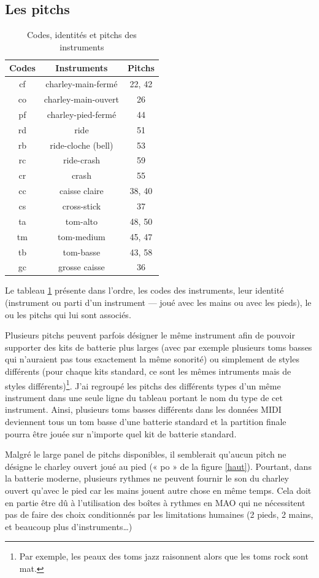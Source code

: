 \subsection*{Les pitchs}
\begin{table}[h]
	\centering
	\begin{tabular}{|c|c|c|} \hline
		Codes & Instruments & Pitchs \\ \hline
		cf & charley-main-fermé & 22, 42 \\
		co & charley-main-ouvert & 26 \\
		pf & charley-pied-fermé & 44 \\
		rd & ride & 51 \\
		rb & ride-cloche (bell) & 53 \\
		rc & ride-crash & 59 \\
		cr & crash & 55 \\
		cc & caisse claire & 38, 40 \\
		cs & cross-stick & 37 \\
		ta & tom-alto & 48, 50 \\
		tm & tom-medium & 45, 47 \\
		tb & tom-basse & 43, 58 \\
		gc & grosse caisse & 36 \\ \hline
	\end{tabular}
	\caption{Codes, identités et pitchs des instruments}
	\label{pitchs_instru}
\end{table}
Le tableau \ref{pitchs_instru} présente dans l’ordre, les codes des
instruments, leur identité (instrument ou parti d’un instrument — joué avec les
mains ou avec les pieds), le ou les pitchs qui lui sont associés.

Plusieurs pitchs peuvent parfois désigner le même instrument afin de pouvoir
supporter des kits de batterie plus larges (avec par exemple plusieurs toms
basses qui n’auraient pas tous exactement la même sonorité) ou simplement de
styles différents (pour chaque kits standard, ce sont les mêmes intruments mais
de styles différents)\footnote{Par exemple, les peaux des
toms jazz raisonnent alors que les toms rock sont mat.}.
J’ai regroupé les pitchs des différents types d’un même instrument dans une
seule ligne du tableau portant le nom du type de cet instrument. Ainsi,
plusieurs toms basses différents dans les données MIDI deviennent tous un tom
basse d’une batterie standard et la partition finale pourra être jouée sur
n’importe quel kit de batterie standard.

Malgré le large panel de pitchs disponibles, il semblerait qu’aucun pitch ne
désigne le charley ouvert joué au pied (« po » de la figure \ref{haut}).
Pourtant, dans la batterie moderne, plusieurs rythmes ne peuvent fournir le son
du charley ouvert qu’avec le pied car les mains jouent autre chose en même
temps. Cela doit en partie être dû à l’utilisation des boîtes à rythmes
en MAO qui ne nécessitent pas de faire des choix conditionnés par les
limitations humaines (2 pieds, 2 mains, et beaucoup plus d’instruments…)

